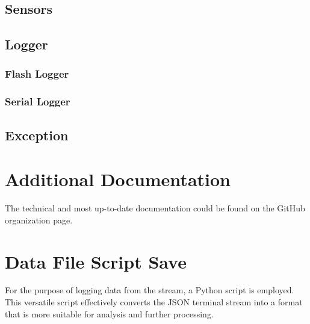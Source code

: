 \subsection{Sensors}

\subsection{Logger}
\subsubsection{Flash Logger}

\subsubsection{Serial Logger}

\subsection{Exception}






\section{Additional Documentation}
The technical and most up-to-date documentation could be found on the GitHub organization page. 

\section{Data File Script Save}
For the purpose of logging data from the stream, a Python script is employed. This versatile script effectively converts the JSON terminal stream into a format that is more suitable for analysis and further processing.
